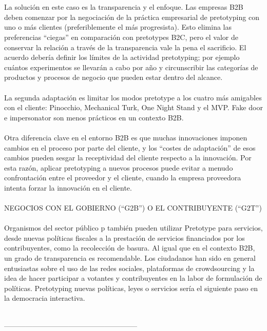 \documentclass{article}
\begin{document}
\\ \\
La soluci\'on en este caso es la transparencia y el enfoque. Las empresas B2B deben comenzar por la negociaci\'on de la pr\'actica empresarial de pretotyping con uno o m\'as clientes (preferiblemente el  m\'as progresista). Esto elimina las preferencias ``ciegas'' en comparaci\'on con pretotypes B2C, pero el valor de conservar la  relaci\'on a trav\'es de la transparencia vale la pena el sacrificio. El acuerdo deber\'ia definir los l\'imites de la actividad pretotyping; por ejemplo cu\'antos experimentos se llevar\'an a cabo por a\~no y circunscribir las categor\'ias de productos y procesos de negocio que pueden estar dentro del alcance.
\\ \\
La segunda adaptaci\'on es limitar los modos pretotype a los cuatro m\'as amigables con el cliente: Pinocchio, Mechanical Turk, One Night Stand y el MVP.
Fake door e impersonator son menos pr\'acticos en un contexto B2B.
\\ \\
Otra diferencia clave en el entorno B2B es que muchas innovaciones imponen cambios en el proceso por parte del cliente, y los ``costes de adaptaci\'on'' de esos cambios pueden sesgar la receptividad del cliente respecto a la innovaci\'on. Por esta raz\'on, aplicar pretotyping a nuevos procesos puede evitar a menudo confrontaci\'on entre el proveedor y el cliente, cuando la empresa proveedora intenta forzar la innovaci\'on en el cliente.
\\ \\
NEGOCIOS CON EL GOBIERNO (``G2B'') O EL CONTRIBUYENTE (``G2T'')
\\ \\
Organismos del sector p\'ublico p tambi\'en pueden utilizar Pretotype para servicios, desde nuevas pol\'iticas fiscales a la prestaci\'on de servicios financiados por los contribuyentes, como la recolecci\'on de basura. Al igual que en el contexto B2B, un grado de transparencia es recomendable. Los ciudadanos han sido en general entusiastas sobre el uso de las redes sociales, plataformas de crowdsourcing y la idea de hacer participar a votantes y contribuyentes en la labor de formulaci\'on de pol\'iticas. Pretotyping nuevas pol\'iticas, leyes o servicios ser\'ia el siguiente paso en la democracia interactiva.
\\ \\

\centerline{--------------------------------------------------------}
\end{document}
